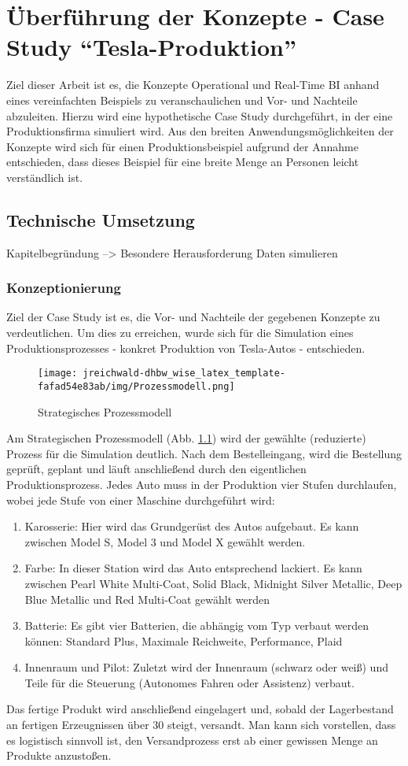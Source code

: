 \chapter{Überführung der Konzepte - Case Study \enquote{Tesla-Produktion}}
Ziel dieser Arbeit ist es, die Konzepte Operational und Real-Time \ac{BI} anhand eines vereinfachten Beispiels zu veranschaulichen und Vor- und Nachteile abzuleiten. Hierzu wird eine hypothetische Case Study durchgeführt, in der eine Produktionsfirma simuliert wird. Aus den breiten Anwendungsmöglichkeiten der Konzepte wird sich für einen Produktionsbeispiel aufgrund der Annahme entschieden, dass dieses Beispiel für eine breite Menge an Personen leicht verständlich ist.
\section{Technische Umsetzung}
Kapitelbegründung --> Besondere Herausforderung Daten simulieren
\subsection{Konzeptionierung}
Ziel der Case Study ist es, die Vor- und Nachteile der gegebenen Konzepte zu verdeutlichen.
Um dies zu erreichen, wurde sich für die Simulation eines Produktionsprozesses - konkret Produktion von Tesla-Autos - entschieden.
\begin{figure}[H]
    \centering
    \texttt{[image: jreichwald-dhbw\_wise\_latex\_template-fafad54e83ab/img/Prozessmodell.png]}
    \caption{Strategisches Prozessmodell}
    \label{fig:bpmn}
\end{figure}
Am Strategischen Prozessmodell (Abb. \ref{fig:bpmn}) wird der gewählte (reduzierte) Prozess für die Simulation deutlich. Nach dem Bestelleingang, wird die Bestellung geprüft, geplant und läuft anschließend durch den eigentlichen Produktionsprozess. Jedes Auto muss in der Produktion vier Stufen durchlaufen, wobei jede Stufe von einer Maschine durchgeführt wird:
\begin{enumerate}
    \item Karosserie: Hier wird das Grundgerüst des Autos aufgebaut. Es kann zwischen Model S, Model 3 und Model X gewählt werden.
    \item Farbe: In dieser Station wird das Auto entsprechend lackiert. Es kann zwischen Pearl White Multi-Coat, Solid Black, Midnight Silver Metallic, Deep Blue Metallic und Red Multi-Coat gewählt werden
    \item Batterie: Es gibt vier Batterien, die abhängig vom Typ verbaut werden können: Standard Plus, Maximale Reichweite, Performance, Plaid
    \item Innenraum und Pilot: Zuletzt wird der Innenraum (schwarz oder weiß) und Teile für die Steuerung (Autonomes Fahren oder Assistenz) verbaut.
\end{enumerate} 
Das fertige Produkt wird anschließend eingelagert und, sobald der Lagerbestand an fertigen Erzeugnissen über 30 steigt, versandt. Man kann sich vorstellen, dass es logistisch sinnvoll ist, den Versandprozess erst ab einer gewissen Menge an Produkte anzustoßen.


